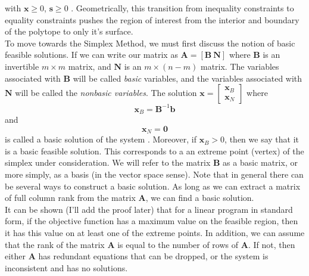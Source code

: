 \documentclass[12pt,english]{article}
\begin{document}
with $\mathbf{x} \geq 0$, $\mathbf{s} \geq 0$ \cite{Wiki:LP}.  Geometrically, this transition from inequality constraints to equality constraints pushes the region of interest from the interior and boundary of the polytope to only it's surface.\\

To move towards the Simplex Method, we must first discuss the notion of basic feasible solutions.   If we can write our matrix as $\mathbf{A} = [\mathbf{B}~ \mathbf{N}]$ where $\mathbf{B}$ is an invertible $m \times m$ matrix, and $\mathbf{N}$ is an $m \times (n-m)$ matrix.  The variables associated with $\mathbf{B}$ will be called {\it basic} variables, and the variables associated with $\mathbf{N}$ will be called the {\it nonbasic variables}. The solution $\mathbf{x} = \left[\begin{array}{c} \mathbf{x}_B \\ \mathbf{x}_N \end{array}\right]$ where 
$$
\mathbf{x}_B = \mathbf{B}^{-1} \mathbf{b}
$$
and
$$
\mathbf{x}_N = \mathbf{0}
$$
is called a basic solution of the system \cite{BaJaSh:90}.  Moreover, if $\mathbf{x}_B >0$, then we say that it is a basic feasible solution.  This corresponds to a an extreme point (vertex) of the simplex under consideration.  We will refer to the matrix $\mathbf{B}$ as a basic matrix, or more simply, as a basis (in the vector space sense).  Note that in general there can be several ways to construct a basic solution.  As long as we can extract a matrix of full column rank from the matrix $\mathbf{A}$, we can find a basic solution.   \\


It can be shown (I'll add the proof later) that for a linear program in standard form, if the objective function has a maximum value on the feasible region, then it has this value on at least one of the extreme points.   In addition, we can assume that the rank of the matrix $\mathbf{A}$ is equal to the number of rows of $\mathbf{A}$.  If not, then either $\mathbf{A}$ has redundant equations that can be dropped, or the system is inconsistent and has no solutions.\\
\end{document}
